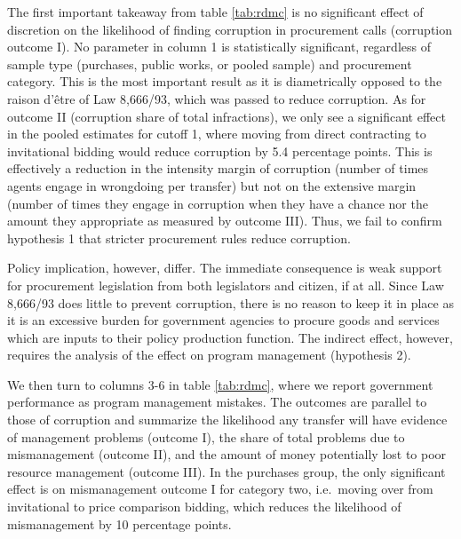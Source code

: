 \documentclass[11pt]{article}
\begin{document}
The first important takeaway from table \ref{tab:rdmc} is no significant effect of discretion on the likelihood of finding corruption in procurement calls (corruption outcome I). No parameter in column 1 is statistically significant, regardless of sample type (purchases, public works, or pooled sample) and procurement category. This is the most important result as it is diametrically opposed to the raison d'être of Law 8,666/93, which was passed to reduce corruption. As for outcome II (corruption share of total infractions), we only see a significant effect in the pooled estimates for cutoff 1, where moving from direct contracting to invitational bidding would reduce corruption by 5.4 percentage points. This is effectively a reduction in the intensity margin of corruption (number of times agents engage in wrongdoing per transfer) but not on the extensive margin (number of times they engage in corruption when they have a chance nor the amount they appropriate as measured by outcome III). Thus, we fail to confirm hypothesis 1 that stricter procurement rules reduce corruption.

Policy implication, however, differ. The immediate consequence is weak support for procurement legislation from both legislators and citizen, if at all. Since Law 8,666/93 does little to prevent corruption, there is no reason to keep it in place as it is an excessive burden for government agencies to procure goods and services which are inputs to their policy production function. The indirect effect, however, requires the analysis of the effect on program management (hypothesis 2).

We then turn to columns 3-6 in table \ref{tab:rdmc}, where we report government performance as program management mistakes. The outcomes are parallel to those of corruption and summarize the likelihood any transfer will have evidence of management problems (outcome I), the share of total problems due to mismanagement (outcome II), and the amount of money potentially lost to poor resource management (outcome III). In the purchases group, the only significant effect is on mismanagement outcome I for category two, i.e.~moving over from invitational to price comparison bidding, which reduces the likelihood of mismanagement by 10 percentage points.
\end{document}
